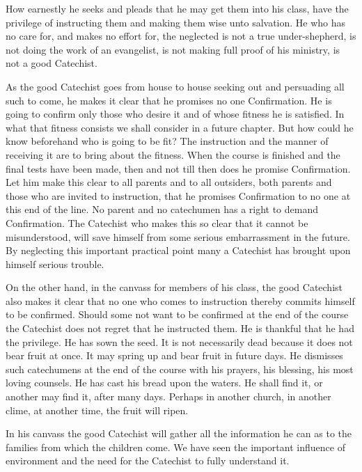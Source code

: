 How earnestly he seeks and pleads that he may get them into his class, have the privilege of instructing them and making them wise unto salvation. He who has no care for, and makes no effort for, the neglected is not a true under-shepherd, is not doing the work of an evangelist, is not making full proof of his ministry, is not a good Catechist.

As the good Catechist goes from house to house seeking out and persuading all such to come, he makes it clear that he promises no one Confirmation.
 He is going to confirm only those who desire it and of whose fitness he is satisfied. In what that fitness consists we shall consider in a future chapter. But how could he know beforehand who is going to be fit? The instruction and the manner of receiving it are to bring about the fitness. When the course is finished and the final tests have been made, then and not till then does he promise Confirmation. Let him make this clear to all parents and to all outsiders, both parents and those who are invited to instruction, that he promises Confirmation to no one at this end of the line. No parent and no catechumen has a right to demand Confirmation. The Catechist who makes this so clear that it cannot be misunderstood, will save himself from some serious embarrassment in the future. By neglecting this important practical point many a Catechist has brought upon himself serious trouble.

 On the other hand, in the canvass for members of his class, the good Catechist also makes it clear that no one who comes to instruction thereby commits himself to be confirmed. Should some not want to be confirmed at the end of the course the Catechist does not regret that he instructed them. He is thankful that he had the privilege. He has sown the seed. It is not necessarily dead because it does not bear fruit at once. It may spring up and bear fruit in future days. He dismisses such catechumens
at the end of the course with his prayers, his blessing, his most loving counsels. He has cast his bread upon the waters. He shall find it, or another may find it, after many days. Perhaps in another church, in another clime, at another time, the fruit will ripen.

In his canvass the good Catechist will gather all the information he can as to the families from which the children come. We have seen the important influence of environment and the need for the Catechist to fully understand it.

